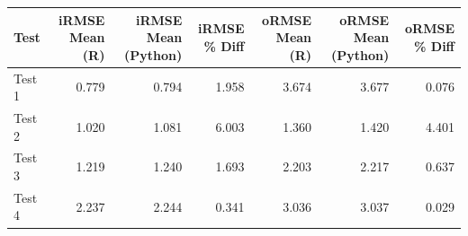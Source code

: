 
\begin{tabular}{l|r|r|r|r|r|r}
\hline
Test & iRMSE Mean (R) & iRMSE Mean (Python) & iRMSE \% Diff & oRMSE Mean (R) & oRMSE Mean (Python) & oRMSE \% Diff\\
\hline
Test 1 & 0.779 & 0.794 & 1.958 & 3.674 & 3.677 & 0.076\\
\hline
Test 2 & 1.020 & 1.081 & 6.003 & 1.360 & 1.420 & 4.401\\
\hline
Test 3 & 1.219 & 1.240 & 1.693 & 2.203 & 2.217 & 0.637\\
\hline
Test 4 & 2.237 & 2.244 & 0.341 & 3.036 & 3.037 & 0.029\\
\hline
\end{tabular}
